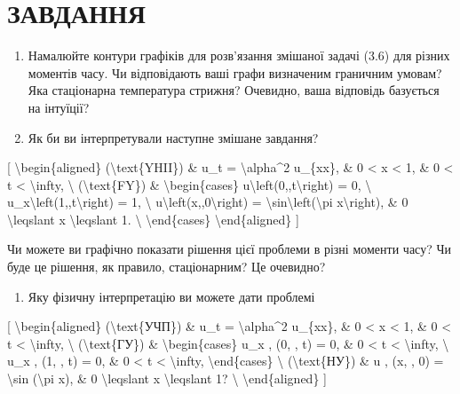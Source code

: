 \documentclass[
]{article}
\providecommand{\tightlist}{%
  \setlength{\itemsep}{0pt}\setlength{\parskip}{0pt}}
\begin{document}
\section{ЗАВДАННЯ}\label{ux437ux430ux432ux434ux430ux43dux43dux44f-1}

\begin{enumerate}
\def\labelenumi{\arabic{enumi}.}
\item
  Намалюйте контури графіків для розв'язання змішаної задачі (3.6) для
  різних моментів часу. Чи відповідають ваші графи визначеним граничним
  умовам? Яка стаціонарна температура стрижня? Очевидно, ваша відповідь
  базується на інтуїції?
\item
  Як би ви інтерпретували наступне змішане завдання?
\end{enumerate}

{[} \textbackslash begin\{aligned\} (\textbackslash text\{YHII\}) \&
u\_t = \textbackslash alpha\^{}2 u\_\{xx\}, \& 0 \textless{} x
\textless{} 1, \& 0 \textless{} t \textless{} \textbackslash infty,
\textbackslash{} (\textbackslash text\{FY\}) \&
\textbackslash begin\{cases\}
u\textbackslash left(0,,t\textbackslash right) = 0, \textbackslash{}
u\_x\textbackslash left(1,,t\textbackslash right) = 1, \textbackslash{}
u\textbackslash left(x,,0\textbackslash right) =
\textbackslash sin\textbackslash left(\textbackslash pi
x\textbackslash right), \& 0 \textbackslash leqslant x
\textbackslash leqslant 1. \textbackslash{} \textbackslash end\{cases\}
\textbackslash end\{aligned\} {]}

Чи можете ви графічно показати рішення цієї проблеми в різні моменти
часу? Чи буде це рішення, як правило, стаціонарним? Це очевидно?

\begin{enumerate}
\def\labelenumi{\arabic{enumi}.}
\setcounter{enumi}{2}
\tightlist
\item
  Яку фізичну інтерпретацію ви можете дати проблемі
\end{enumerate}

{[} \textbackslash begin\{aligned\} (\textbackslash text\{УЧП\}) \& u\_t
= \textbackslash alpha\^{}2 u\_\{xx\}, \& 0 \textless{} x \textless{} 1,
\& 0 \textless{} t \textless{} \textbackslash infty, \textbackslash{}
(\textbackslash text\{ГУ\}) \& \textbackslash begin\{cases\} u\_x , (0,
, t) = 0, \& 0 \textless{} t \textless{} \textbackslash infty,
\textbackslash{} u\_x , (1, , t) = 0, \& 0 \textless{} t \textless{}
\textbackslash infty, \textbackslash end\{cases\} \textbackslash{}
(\textbackslash text\{НУ\}) \& u , (x, , 0) = \textbackslash sin
(\textbackslash pi x), \& 0 \textbackslash leqslant x
\textbackslash leqslant 1? \textbackslash{}
\textbackslash end\{aligned\} {]}
\end{document}
